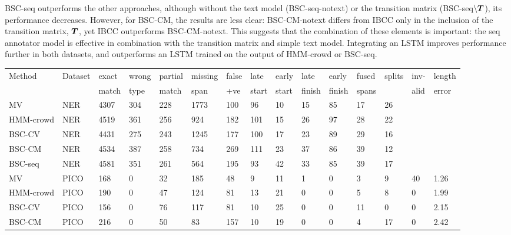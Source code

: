 BSC-seq outperforms the other approaches, although 
without the text model (BSC-seq-notext) or the transition matrix (BSC-seq$\backslash\boldsymbol T$),
its performance decreases.
However, for BSC-CM, the results are less clear: BSC-CM-notext differs from IBCC only in the 
inclusion of the transition matrix, $\boldsymbol T$, yet IBCC outperforms BSC-CM-notext.
This suggests that the combination of these elements is important: the seq annotator model is effective 
in combination with the transition matrix and simple text model.
Integrating an LSTM improves performance further in both datasets, and outperforms an LSTM trained on the output of HMM-crowd or BSC-seq.

\begin{table}[h]
\small
\centering
\setlength{\tabcolsep}{4pt}
\begin{tabular}{l l l l l l l l l l l l l l l }
\toprule
Method & Dataset & exact & wrong & partial  & missing  & false & late & early & late & early & fused & splits & inv- &  length \\ 
 & & match & type & match & span & +ve & start & start & finish & finish & spans &  & alid & error \\
\midrule
MV & NER & 4307 & 304 & 228 & 1773 & 100 & 96 & 10 & 15 & 85 & 17 & 26 \\
HMM-crowd & NER & 4519 & 361 & 256 & 924 & 182 & 101 & 15 & 26 & 97 & 28 & 22 \\
BSC-CV & NER & 4431 & 275 & 243 & 1245 & 177 & 100 & 17 & 23 & 89 & 29 & 16 \\
BSC-CM & NER & 4534 & 387 & 258 & 734 & 269 & 111 & 23 & 37 & 86 & 39 & 12 \\
BSC-seq & NER & 4581 & 351 & 261 & 564 & 195 & 93 & 42 & 33 & 85 & 39 & 17 
\\
\midrule 
MV & PICO  & 168 & 0 & 32 & 185 & 48 & 9 & 11 & 1 & 0 & 3 & 9 & 40 & 1.26 \\
HMM-crowd& PICO & 190 & 0 & 47 & 124 & 81 & 13 & 21 & 0 & 0 & 5 & 8 & 0 & 1.99 \\
BSC-CV     & PICO & 156 & 0 & 76 & 117 & 81 & 10 & 25 & 0 & 0 & 11 & 0 & 0 & 2.15 \\
BSC-CM     & PICO & 216 & 0 & 50 & 83 & 157 & 10 & 19 & 0 & 0 & 4 & 17 & 0 & 2.42\\

\end{tabular}
\end{table}
